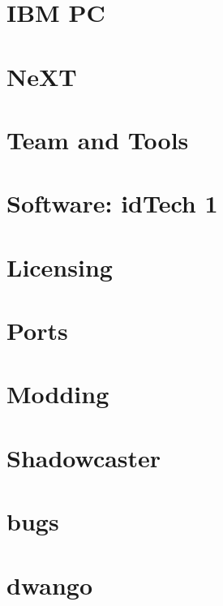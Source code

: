 \documentclass{book}
\begin{document}
   
      \chapter{IBM PC}
        
        
        
            
         
        
        
        
     \chapter{NeXT}
          


    

    \chapter{Team and Tools}
          
      
      
      





    \chapter{Software: idTech 1}
      
      
      
      
      
      
      
      
      
      
      
      

    \chapter{Licensing}
      
      
      

    \chapter{Ports}        
          

    \chapter{Modding}
      

    \appendix
    \appendixpage
      \chapter{Shadowcaster}  
      
      \chapter{bugs}
      
      \chapter{dwango}
      
    \cleartoleftpage %
    
    \blankpage
    \blankpage
\end{document}
